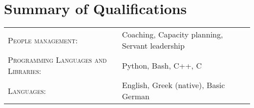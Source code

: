 \documentclass[alan.tex]{subfiles}
\begin{document}
  \section{Summary of Qualifications}
  \begin{tabular}{ll}
    \textsc{People management}: & Coaching, Capacity planning, Servant leadership \\
    \textsc{Programming Languages and Libraries}:  & Python, Bash, C++, C\\
    \textsc{Languages}: & English, Greek (native), Basic German
  \end{tabular}
\end{document}
